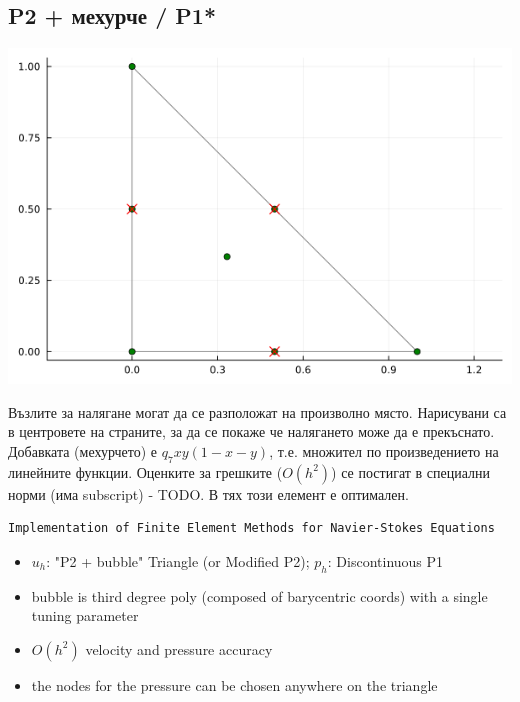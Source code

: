 \documentclass[fleqn,12pt]{article}
\begin{document}
\subsection{P2 + мехурче / P1*}
\includegraphics[width=140mm]{img/p2_bubble_p1.png}

Възлите за налягане могат да се разположат на произволно място.
Нарисувани са в центровете на страните, за да се покаже че налягането може да е прекъснато.
Добавката (мехурчето) е $q_7 xy(1-x-y)$, т.е. множител по произведението на линейните функции.
Оценките за грешките ($O(h^2)$) се постигат в специални норми (има subscript) - TODO.
В тях този елемент е оптимален.

\begin{verbatim}
Implementation of Finite Element Methods for Navier-Stokes Equations
\end{verbatim}
\begin{itemize}
\item $u_h$: "P2 + bubble" Triangle (or Modified P2); $p_h$: Discontinuous P1
\item bubble is third degree poly (composed of barycentric coords) with a single tuning parameter
\item $O(h^2)$ velocity and pressure accuracy
\item the nodes for the pressure can be chosen anywhere on the triangle
\end{itemize}
\end{document}
